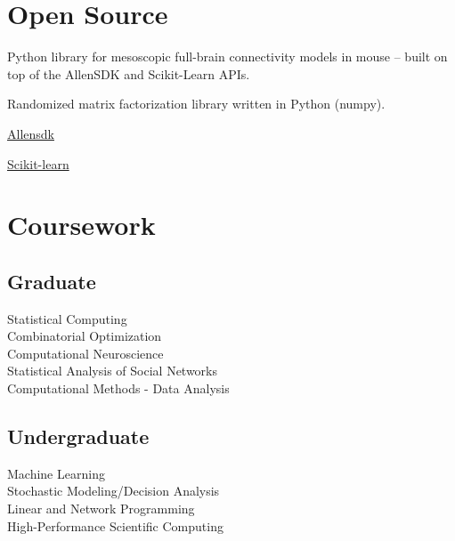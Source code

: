 \documentclass[]{deedy-resume-openfont}
\begin{document}
\begin{minipage}[t]{0.35\textwidth}

\section{Open Source}
Python library for mesoscopic full-brain connectivity models in mouse -- built on top of the AllenSDK and Scikit-Learn APIs.
\sectionsep

Randomized matrix factorization library written in Python (numpy).
\sectionsep

\vspace{\topsep}
\begin{tightemize}
\item \href{https://github.com/alleninstitute/allensdk}{Allensdk}
\item \href{https://github.com/scikit-learn/scikit-learn}{Scikit-learn}
\end{tightemize}
\sectionsep



\section{Coursework}
\subsection{Graduate}
Statistical Computing \\
Combinatorial Optimization \\
Computational Neuroscience \\
Statistical Analysis of Social Networks \\
Computational Methods - Data Analysis \\
\sectionsep

\subsection{Undergraduate}
Machine Learning \\
Stochastic Modeling/Decision Analysis \\
Linear and Network Programming \\
High-Performance Scientific Computing \\



\end{minipage}
\end{document}
